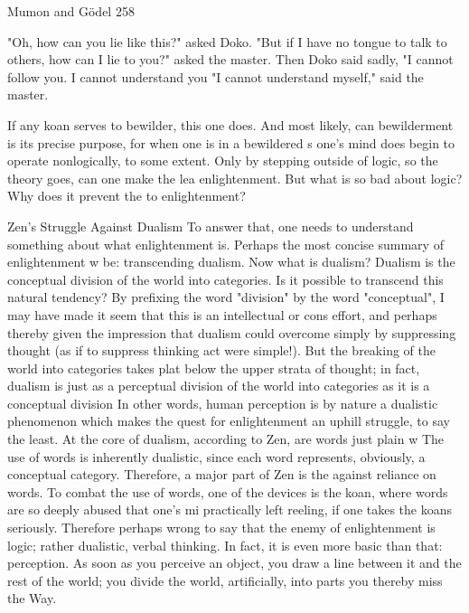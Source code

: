 Mumon and Gödel                                                                       258

       "Oh, how can you lie like this?" asked Doko.
       "But if I have no tongue to talk to others, how can I lie to you?" asked the master.
       Then Doko said sadly, "I cannot follow you. I cannot understand you
       "I cannot understand myself," said the master.

If any koan serves to bewilder, this one does. And most likely, can bewilderment is its
precise purpose, for when one is in a bewildered s one's mind does begin to operate
nonlogically, to some extent. Only by stepping outside of logic, so the theory goes, can
one make the lea enlightenment. But what is so bad about logic? Why does it prevent the
to enlightenment?

                          Zen's Struggle Against Dualism
To answer that, one needs to understand something about what enlightenment is. Perhaps
the most concise summary of enlightenment w be: transcending dualism. Now what is
dualism? Dualism is the conceptual division of the world into categories. Is it possible to
transcend this natural tendency? By prefixing the word "division" by the word
"conceptual", I may have made it seem that this is an intellectual or cons effort, and
perhaps thereby given the impression that dualism could overcome simply by suppressing
thought (as if to suppress thinking act were simple!). But the breaking of the world into
categories takes plat below the upper strata of thought; in fact, dualism is just as a
perceptual division of the world into categories as it is a conceptual division In other
words, human perception is by nature a dualistic phenomenon which makes the quest for
enlightenment an uphill struggle, to say the least.
        At the core of dualism, according to Zen, are words just plain w The use of words
is inherently dualistic, since each word represents, obviously, a conceptual category.
Therefore, a major part of Zen is the against reliance on words. To combat the use of
words, one of the devices is the koan, where words are so deeply abused that one's mi
practically left reeling, if one takes the koans seriously. Therefore perhaps wrong to say
that the enemy of enlightenment is logic; rather dualistic, verbal thinking. In fact, it is
even more basic than that: perception. As soon as you perceive an object, you draw a line
between it and the rest of the world; you divide the world, artificially, into parts you
thereby miss the Way.

